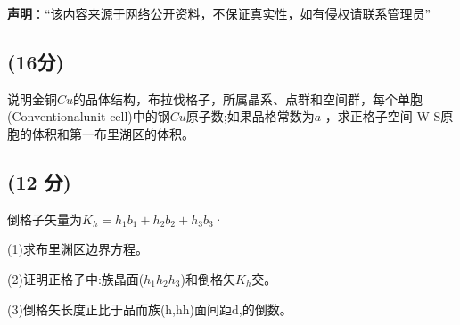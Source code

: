 
\textbf{声明}：“该内容来源于网络公开资料，不保证真实性，如有侵权请联系管理员”

\subsection{(16分)}
说明金铜$Cu$的品体结构，布拉伐格子，所属晶系、点群和空间群，每个单胞(Conventionalunit cell)中的钢$Cu$原子数;如果品格常数为$a$ ，求正格子空间 W-S原胞的体积和第一布里湖区的体积。
\subsection{(12 分)}
倒格子矢量为$K_h=h_1b_1+h_2b_2+h_3b_3$·

(1)求布里渊区边界方程。

(2)证明正格子中:族晶面($h_1h_2h_3$)和倒格矢$K_h$交。

(3)倒格矢长度正比于品而族(h,hh)面间距d,的倒数。